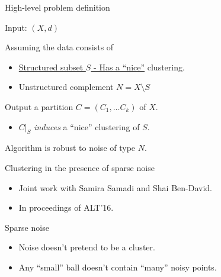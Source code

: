 \documentclass{beamer}
\begin{document}
\begin{frame}[label=noiseFramework]{High-level problem definition}

	Input: $(X, d)$
	\vspace{20pt}
	
	Assuming the data consists of 
	\begin{itemize}
	\vspace{5pt} \item \hyperlink{notesClusterability}{Structured subset $S$ - Has a ``nice''} clustering.  
	\vspace{5pt} \item Unstructured complement $N = X \setminus S$
	\end{itemize}

	\vspace{20pt}
	{\color{blue} Output} a partition $C=(C_1, \ldots C_k)$ of $X$.
	\begin{itemize}
		\vspace{5pt}\item $C|_{S} $ \emph{induces} a ``nice'' clustering of $S$. 
	\end{itemize}

	\vspace{20pt} Algorithm is robust to noise of type $N$.
\end{frame}

\begin{frame}{Clustering in the presence of sparse noise}
	\begin{itemize}
		\item Joint work with Samira Samadi and Shai Ben-David.
		\vspace{20pt}\item In proceedings of \alert{ALT'16}. 
	\end{itemize}
\end{frame}

\begin{frame}{Sparse noise}
	\begin{itemize}
		\item Noise doesn't pretend to be a cluster.
		\vspace{20pt}\item Any ``small'' ball doesn't contain ``many'' noisy points.
	\end{itemize}
\end{frame}
\end{document}

